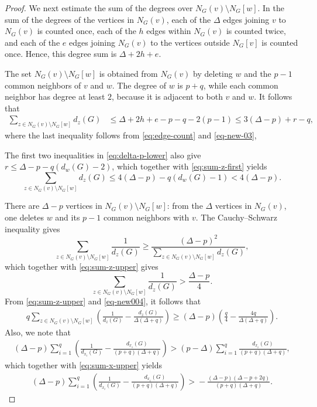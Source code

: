 \documentclass[10pt]{article}
\begin{document}
\begin{proof}
We next estimate the sum of the degrees over
$N_G(v)\setminus N_G[w]$. In the sum of the degrees of the vertices in
$N_G(v)$, each of the $\Delta$ edges joining $v$ to $N_G(v)$ is counted
once, each of the $h$ edges within $N_G(v)$ is counted twice, and each
of the $e$ edges joining $N_G(v)$ to the vertices outside $N_G[v]$ is
counted once. Hence, this degree sum is $\Delta+2h+e$.

The set $N_G(v)\setminus N_G[w]$ is obtained from $N_G(v)$ by deleting
$w$ and the $p-1$ common neighbors of $v$ and $w$. The degree of $w$ is
$p+q$, while each common neighbor has degree at least $2$, because
it is adjacent to both $v$ and $w$. It follows that
\begin{align}
\sum_{z\in N_G(v)\setminus N_G[w]}d_z(G)
&\le\Delta+2h+e-p-q-2(p-1)\le3(\Delta-p)+r-q,
\label{eq:sum-z-first}
\end{align}
where the last inequality follows from \eqref{eq:edge-count} and \eqref{eq-new-03},


The first two inequalities in \eqref{eq:delta-p-lower} also give
$r\le\Delta-p-q(d_w(G)-2)$, which together with
\eqref{eq:sum-z-first} yields
\begin{equation}\label{eq:sum-z-upper}
\sum_{z\in N_G(v)\setminus N_G[w]}d_z(G)
\le4(\Delta-p)-q(d_w(G)-1)<4(\Delta-p).
\end{equation}


There are $\Delta-p$ vertices in $N_G(v)\setminus N_G[w]$: from the
$\Delta$ vertices in $N_G(v)$, one deletes $w$ and its $p-1$ common
neighbors with $v$. The Cauchy--Schwarz inequality gives
\[
\sum_{z\in N_G(v)\setminus N_G[w]}\frac1{d_z(G)}
\ge
\frac{(\Delta-p)^2}
{\displaystyle\sum_{z\in N_G(v)\setminus N_G[w]}d_z(G)},
\]
which together with \eqref{eq:sum-z-upper} gives
\begin{equation}\label{eq-new004}
\sum_{z\in N_G(v)\setminus N_G[w]}\frac1{d_z(G)}
>\frac{\Delta-p}{4}.
\end{equation}
From \eqref{eq:sum-z-upper}
and \eqref{eq-new004}, it follows that   \begin{align}
q\sum_{z\in N_G(v)\setminus N_G[w]}
\left(\frac1{d_z(G)}-\frac{d_z(G)}{\Delta(\Delta+q)}\right)
\ge(\Delta-p)
\left(\frac q4-\frac{4q}{\Delta(\Delta+q)}\right).
\label{eq:first-sum-bound}
\end{align}
Also, we note that
\begin{align*}
(\Delta-p)\sum_{i=1}^{q}
\left(\frac1{d_{x_i}(G)}-
\frac{d_{x_i}(G)}{(p+q)(\Delta+q)}\right)>(p-\Delta)\sum_{i=1}^{q}
\frac{d_{x_i}(G)}{(p+q)(\Delta+q)},
\end{align*}
which together with \eqref{eq:sum-x-upper} yields
\begin{align}
(\Delta-p)\sum_{i=1}^{q}
\left(\frac1{d_{x_i}(G)}-
\frac{d_{x_i}(G)}{(p+q)(\Delta+q)}\right)
>{}-\frac{(\Delta-p)(\Delta-p+2q)}{(p+q)(\Delta+q)}.
\label{eq:second-sum-bound}
\end{align}


\end{proof}
\end{document}
